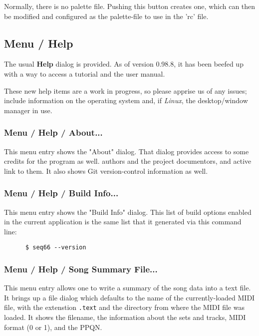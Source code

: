    Normally, there is no palette file.  Pushing this button creates one, which
   can then be modified and configured as the palette-file to use in the 'rc'
   file.

\subsection{Menu / Help}
\label{subsec:menu_help}

   The usual \textbf{Help} dialog is provided.
   As of version 0.98.8, it has been beefed up with a way to access a
   tutorial and the user manual.

   These new help items are a work in progress, so please apprise
   us of any issues; include information on the operating system and,
   if \textsl{Linux}, the desktop/window manager in use.

\subsubsection{Menu / Help / About...}
\label{subsubsec:menu_help_about}

   This menu entry shows the "About" dialog.
   That dialog provides access to some credits for the program as well.
   authors and the project documentors, and active link to them.
   It also shows Git version-control information as well.

\subsubsection{Menu / Help / Build Info...}
\label{subsubsec:menu_help_build_info}

   This menu entry shows the "Build Info" dialog.  This list of
   build options enabled in the current application is the same list
   that it generated via this command line:

   \begin{verbatim}
      $ seq66 --version
   \end{verbatim}

\subsubsection{Menu / Help / Song Summary File...}
\label{subsubsec:menu_help_song_summary_file}

   This menu entry allows one to write a summary of the song data into a text
   file. It brings up a file dialog which defaults to the name of the
   currently-loaded MIDI file, with the extenstion \texttt{.text} and
   the directory from where the MIDI file was loaded.
   It shows the filename, the information about the sets and tracks,
   MIDI format (0 or 1), and the PPQN.

